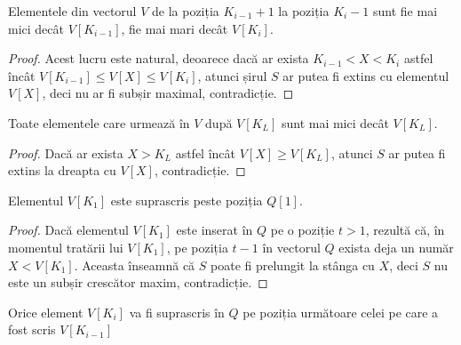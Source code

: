 \begin{proposition}
  Elementele din vectorul $V$ de la poziția $K_{i-1}+1$ la poziția $K_{i}-1$
  sunt fie mai mici decât $V[K_{i-1}]$, fie mai mari decât $V[K_i]$.
\end{proposition}

\begin{proof}
  Acest lucru este natural, deoarece dacă ar exista $K_{i-1} < X <K_i$ astfel
  încât $V[K_{i-1}] \leq V[X] \leq V[K_i]$, atunci șirul $S$ ar putea fi
  extins cu elementul $V[X]$, deci nu ar fi subșir maximal, contradicție.
\end{proof}

\begin{proposition}
  Toate elementele care urmează în $V$ după $V[K_L]$ sunt mai mici decât
  $V[K_L]$.
\end{proposition}

\begin{proof}
  Dacă ar exista $X>K_L$ astfel încât $V[X] \geq V[K_L]$, atunci $S$ ar putea fi
  extins la dreapta cu $V[X]$, contradicție.
\end{proof}

\begin{proposition}
  Elementul $V[K_1]$ este suprascris peste poziția $Q[1]$.
\end{proposition}

\begin{proof}
  Dacă elementul $V[K_1]$ este inserat în $Q$ pe o poziție $t>1$, rezultă că,
  în momentul tratării lui $V[K_1]$, pe poziția $t-1$ în vectorul $Q$ exista
  deja un număr $X < V[K_1]$. Aceasta înseamnă că $S$ poate fi prelungit la
  stânga cu $X$, deci $S$ nu este un subșir crescător maxim, contradicție.
\end{proof}

\begin{proposition}
  Orice element $V[K_i]$ va fi suprascris în $Q$ pe poziția următoare celei pe
  care a fost scris $V[K_{i-1}]$
\end{proposition}

